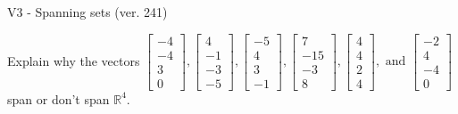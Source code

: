 \begin{exercise}
  \begin{exerciseTitle}V3 - Spanning sets (ver. 241)\end{exerciseTitle}
  \begin{exerciseStatement}
    Explain why the vectors \(\left[\begin{array}{r}
-4 \\
-4 \\
3 \\
0
\end{array}\right] , \left[\begin{array}{r}
4 \\
-1 \\
-3 \\
-5
\end{array}\right] , \left[\begin{array}{r}
-5 \\
4 \\
3 \\
-1
\end{array}\right] , \left[\begin{array}{r}
7 \\
-15 \\
-3 \\
8
\end{array}\right] , \left[\begin{array}{r}
4 \\
4 \\
2 \\
4
\end{array}\right] , \text{ and } \left[\begin{array}{r}
-2 \\
4 \\
-4 \\
0
\end{array}\right]\) span or don't span \(\mathbb{R}^4\). 
	



\end{exerciseStatement}
\end{exercise}

